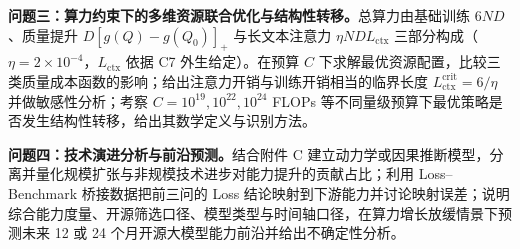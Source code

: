 \textbf{问题三：算力约束下的多维资源联合优化与结构性转移。}总算力由基础训练 $6ND$、质量提升 $D[g(Q)-g(Q_0)]_+$ 与长文本注意力 $\eta NDL_{\mathrm{ctx}}$ 三部分构成（$\eta=2\times10^{-4}$，$L_{\mathrm{ctx}}$ 依据 C7 外生给定）。在预算 $C$ 下求解最优资源配置，比较三类质量成本函数的影响；给出注意力开销与训练开销相当的临界长度 $L_{\mathrm{ctx}}^{\mathrm{crit}}=6/\eta$ 并做敏感性分析；考察 $C=10^{19},10^{22},10^{24}$ FLOPs 等不同量级预算下最优策略是否发生结构性转移，给出其数学定义与识别方法。

\textbf{问题四：技术演进分析与前沿预测。}结合附件 C 建立动力学或因果推断模型，分离并量化规模扩张与非规模技术进步对能力提升的贡献占比；利用 Loss--Benchmark 桥接数据把前三问的 Loss 结论映射到下游能力并讨论映射误差；说明综合能力度量、开源筛选口径、模型类型与时间轴口径，在算力增长放缓情景下预测未来 12 或 24 个月开源大模型能力前沿并给出不确定性分析。
